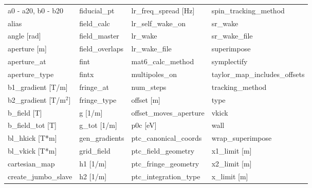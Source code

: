  \begin{tabular}{llll} \toprule
a0 - a20, b0 - b20               & fiducial_pt                      & lr_freq_spread [Hz]              & spin_tracking_method             \\
alias                            & field_calc                       & lr_self_wake_on                  & sr_wake                          \\
angle [rad]                      & field_master                     & lr_wake                          & sr_wake_file                     \\
aperture [m]                     & field_overlaps                   & lr_wake_file                     & superimpose                      \\
aperture_at                      & fint                             & mat6_calc_method                 & symplectify                      \\
aperture_type                    & fintx                            & multipoles_on                    & taylor_map_includes_offsets      \\
b1_gradient [T/m]                & fringe_at                        & num_steps                        & tracking_method                  \\
b2_gradient [T/m$^2$]            & fringe_type                      & offset [m]                       & type                             \\
b_field [T]                      & g [1/m]                          & offset_moves_aperture            & vkick                            \\
b_field_tot [T]                  & g_tot [1/m]                      & p0c [eV]                         & wall                             \\
bl_hkick [T*m]                   & gen_gradients                    & ptc_canonical_coords             & wrap_superimpose                 \\
bl_vkick [T*m]                   & grid_field                       & ptc_field_geometry               & x1_limit [m]                     \\
cartesian_map                    & h1 [1/m]                         & ptc_fringe_geometry              & x2_limit [m]                     \\
create_jumbo_slave               & h2 [1/m]                         & ptc_integration_type             & x_limit [m]                      \\

\end{tabular}
